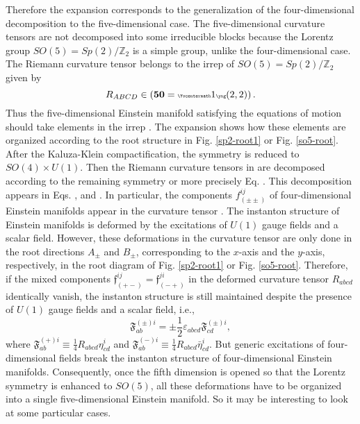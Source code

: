 \documentclass[12pt,epsf]{article}
\begin{document}
Therefore the expansion  corresponds to the generalization of
the four-dimensional decomposition  to the five-dimensional case.
The five-dimensional curvature tensors are not decomposed into some irreducible blocks because
the Lorentz group $SO(5) = Sp(2)/\mathbb{Z}_2$ is a simple group, unlike the four-dimensional case.
The Riemann curvature tensor belongs to the irrep of $SO(5) = Sp(2)/\mathbb{Z}_2$ given by
\begin{equation}\label{riem-50}
  R_{ABCD} \in \left(\mathbf{50} = {\tiny  \Yvcentermath1 \yng(2,2)} \right).
\end{equation}
Thus the five-dimensional Einstein manifold satisfying the equations of motion 
should take elements in the irrep .
The expansion  shows how these elements are organized according to the root structure in
Fig. \ref{sp2-root1} or Fig. \ref{so5-root}.
After the Kaluza-Klein compactification, the symmetry is reduced
to $SO(4) \times U(1)$. Then the Riemann curvature tensors in 
are decomposed according to the remaining symmetry  or more precisely Eq. .
This decomposition appears in Eqs. ,  and .
In particular, the components $f^{ij}_{(\pm\pm)}$ of four-dimensional Einstein manifolds appear
in the curvature tensor . The instanton structure of Einstein manifolds is deformed
by the excitations of $U(1)$ gauge fields and a scalar field.
However, these deformations in the curvature tensor  are only done in the root directions
$A_\pm$ and $B_\pm$, corresponding to the $x$-axis and the $y$-axis, respectively, in the root diagram of
Fig. \ref{sp2-root1} or Fig. \ref{so5-root}. Therefore, if the mixed components $\mathfrak{f}^{ij}_{(+-)}
= \mathfrak{f}^{ji}_{(-+)}$ in the deformed curvature tensor $R_{abcd}$ identically vanish,
the instanton structure is still maintained despite the presence of $U(1)$ gauge fields and a scalar field, i.e.,
\begin{equation}\label{def-inst}
 \mathfrak{F}^{(\pm)i}_{ab} = \pm \frac{1}{2} \varepsilon_{abcd} \mathfrak{F}^{(\pm)i}_{cd},
\end{equation}
where $\mathfrak{F}^{(+)i}_{ab} \equiv \frac{1}{4} R_{abcd} \eta^i_{cd}$
and $\mathfrak{F}^{(-)i}_{ab} \equiv \frac{1}{4} R_{abcd} \bar{\eta}^i_{cd}$.
But generic excitations of four-dimensional fields break the instanton structure of
four-dimensional Einstein manifolds. Consequently, once the fifth dimension is opened so that
the Lorentz symmetry is enhanced to $SO(5)$,
all these deformations have to be organized into a single five-dimensional Einstein manifold.
So it may be interesting to look at some particular cases.
\end{document}
